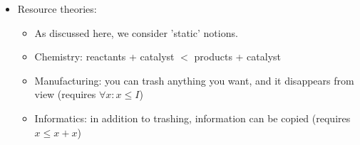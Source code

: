 \begin{itemize}
    \item Resource theories:
          \begin{itemize}
            \item As discussed here, we consider 'static' notions.
            \item Chemistry: reactants + catalyst $<$ products + catalyst
            \item Manufacturing: you can trash anything you want, and it disappears from view (requires $\forall x: x \leq I$)
            \item Informatics: in addition to trashing, information can be copied (requires $x \leq x + x$)
          \end{itemize}
  \end{itemize}
